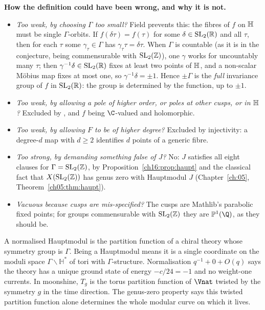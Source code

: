 \begin{dictionary}
\textbf{How the definition could have been wrong, and why it is not.}
\begin{itemize}
\item \emph{Too weak, by choosing $\Gamma$ too small?}  Field  prevents this: the fibres of $f$ on
  $\mathbb{H}$ must be single $\Gamma$-orbits.  If $f(\delta\tau)=f(\tau)$ for some $\delta\in\mathrm{SL}_2(\mathbb{R})$ and all
  $\tau$, then for each $\tau$ some $\gamma_\tau\in\Gamma$ has $\gamma_\tau\tau=\delta\tau$.  When $\Gamma$ is countable (as it is in the
  conjecture, being commensurable with $\mathrm{SL}_2(\mathbb{Z})$), one $\gamma$ works for uncountably many $\tau$; then
  $\gamma^{-1}\delta\in\mathrm{SL}_2(\mathbb{R})$ fixes at least two points of $\mathbb{H}$, and a non-scalar M\"obius map fixes
  at most one, so $\gamma^{-1}\delta=\pm1$.  Hence $\pm\Gamma$ is the \emph{full} invariance group of $f$ in
  $\mathrm{SL}_2(\mathbb{R})$: the group is determined by the function, up to $\pm1$.
\item \emph{Too weak, by allowing a pole of higher order, or poles at other cusps, or in $\mathbb{H}$?}  Excluded by
  ,  and $f$ being $\C$-valued and holomorphic.
\item \emph{Too weak, by allowing $F$ to be of higher degree?}  Excluded by injectivity: a degree-$d$ map with $d\ge2$
  identifies $d$ points of a generic fibre.
\item \emph{Too strong, by demanding something false of $J$?}  No: $J$ satisfies all eight clauses for
  $\Gamma=\mathrm{SL}_2(\mathbb{Z})$, by Proposition~\ref{ch16:prop:haupt} and the classical fact that $X(\mathrm{SL}_2(\mathbb{Z}))$ has genus
  zero with Hauptmodul $J$ (Chapter~\ref{ch:05}, Theorem~\ref{ch05:thm:haupt}).
\item \emph{Vacuous because cusps are mis-specified?}  The cusps are Mathlib's parabolic fixed points; for groups
  commensurable with $\mathrm{SL}_2(\mathbb{Z})$ they are $\chsixteenP(\Q)$, as they should be.
\end{itemize}
\end{dictionary}

\begin{physics}
A normalised Hauptmodul is the partition function of a chiral theory whose symmetry group is $\Gamma$. Being a
Hauptmodul means it is a single coordinate on the moduli space $\Gamma\backslash\mathbb H^{*}$ of tori with
$\Gamma$-structure. Normalisation $q^{-1}+0+O(q)$ says the theory has a unique ground state of energy $-c/24=-1$ and
no weight-one currents. In moonshine, $T_g$ is the torus partition function of $\Vnat$ twisted by the symmetry $g$ in
the time direction. The genus-zero property says this twisted partition function alone determines the whole modular
curve on which it lives.
\end{physics}

